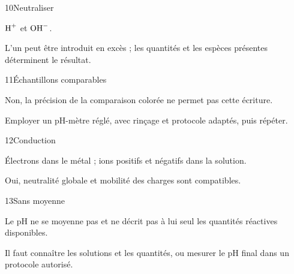 \par\noindent\begin{minipage}{\linewidth}
\begin{corrige}{10}{Neutraliser}
\begin{questions}
\item $\ce{H+}$ et $\ce{OH-}$.
\item L’un peut être introduit en excès ; les quantités et les espèces présentes déterminent le résultat.
\end{questions}
\end{corrige}
\end{minipage}
\par\noindent\begin{minipage}{\linewidth}
\begin{corrige}{11}{Échantillons comparables}
\begin{questions}
\item Non, la précision de la comparaison colorée ne permet pas cette écriture.
\item Employer un pH-mètre réglé, avec rinçage et protocole adaptés, puis répéter.
\end{questions}
\end{corrige}
\end{minipage}
\par\noindent\begin{minipage}{\linewidth}
\begin{corrige}{12}{Conduction}
\begin{questions}
\item Électrons dans le métal ; ions positifs et négatifs dans la solution.
\item Oui, neutralité globale et mobilité des charges sont compatibles.
\end{questions}
\end{corrige}
\end{minipage}
\par\noindent\begin{minipage}{\linewidth}
\begin{corrige}{13}{Sans moyenne}
\begin{questions}
\item Le pH ne se moyenne pas et ne décrit pas à lui seul les quantités réactives disponibles.
\item Il faut connaître les solutions et les quantités, ou mesurer le pH final dans un protocole autorisé.
\end{questions}
\end{corrige}
\end{minipage}
